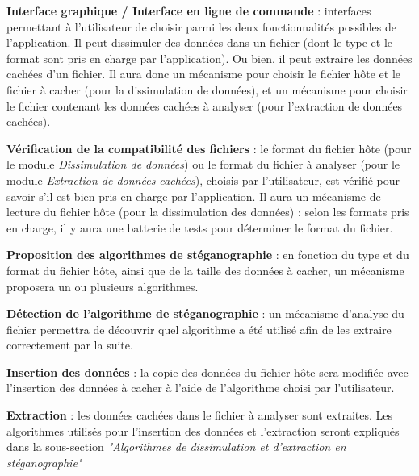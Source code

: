 \documentclass[11pt]{article}
\begin{document}
\begin{description}
\small
\item[a)] \textbf{Interface graphique / Interface en ligne de commande} :
    interfaces permettant à l'utilisateur de choisir parmi les deux
    fonctionnalités possibles de l'application. Il peut dissimuler des
    données dans un fichier (dont le type et le format sont pris en charge
    par l'application). Ou bien, il peut extraire les données cachées d'un
    fichier. \newline
    Il aura donc un mécanisme pour choisir le fichier hôte et le fichier 
    à cacher (pour la dissimulation de données), et un mécanisme pour choisir le 
    fichier contenant les données cachées à analyser (pour l'extraction de 
    données cachées). 
    

\item[b)] \textbf{Vérification de la compatibilité des fichiers} : le format 
	du fichier hôte (pour le module \textit{Dissimulation de données}) ou 
	le format du fichier à analyser (pour le module \textit{Extraction de données 
	cachées}), choisis par l'utilisateur, est vérifié pour savoir s'il est 
	bien pris en charge par l'application. \newline
	Il aura un mécanisme de lecture du fichier hôte (pour la dissimulation 
	des données) : selon les formats pris en charge, il y aura une batterie
	de tests pour déterminer le format du fichier. 

\item[c)] \textbf{Proposition des algorithmes de stéganographie} : en fonction
    du type et du format du fichier hôte, ainsi que de la taille des données à
    cacher, un mécanisme proposera un ou plusieurs algorithmes. 

\item[d)] \textbf{Détection de l'algorithme de stéganographie} : un mécanisme 
	d'analyse du fichier permettra de découvrir quel algorithme a été utilisé 
	afin de les extraire correctement par la suite. 

\item[e)] \textbf{Insertion des données} : la copie des données du fichier hôte
    sera modifiée avec l'insertion des données à cacher à l'aide de l'algorithme
    choisi par l'utilisateur. 

\item[f)] \textbf{Extraction} : les données cachées dans le fichier à analyser
    sont extraites. Les algorithmes utilisés pour l'insertion des données 
    et l'extraction seront expliqués dans la sous-section \textit{"Algorithmes 
    de dissimulation et d'extraction en stéganographie"}

\end{description}
\end{document}
